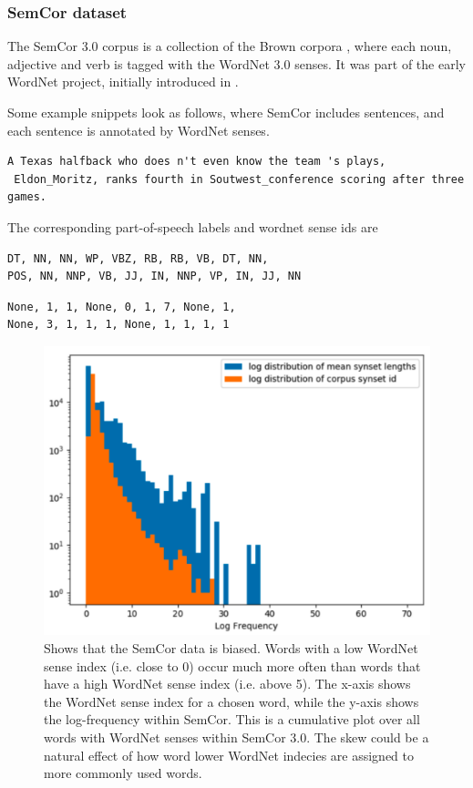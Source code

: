 \documentclass[a4paper,12pt,twoside,openright]{report}
\begin{document}
\subsubsection{SemCor dataset}

The SemCor 3.0 corpus is a collection of the Brown corpora \cite{francis64}, where each noun, adjective and verb is tagged with the WordNet 3.0 senses.
It was part of the early WordNet project, initially introduced in \cite{miller94}.

Some example snippets look as follows, where SemCor includes sentences, and each sentence is annotated by WordNet senses.

\begin{verbatim}
A Texas halfback who does n't even know the team 's plays,
 Eldon_Moritz, ranks fourth in Soutwest_conference scoring after three games.
\end{verbatim}

The corresponding part-of-speech labels and wordnet sense ids 
are
\begin{verbatim}
DT, NN, NN, WP, VBZ, RB, RB, VB, DT, NN, 
POS, NN, NNP, VB, JJ, IN, NNP, VP, IN, JJ, NN
\end{verbatim}

\begin{verbatim}
None, 1, 1, None, 0, 1, 7, None, 1, 
None, 3, 1, 1, 1, None, 1, 1, 1, 1
\end{verbatim}


\begin{figure}[h]
	\center
  \includegraphics[width=0.6\linewidth]{./assets/background/semcor_skew.png}
  \caption{Shows that the SemCor data is biased. Words with a low WordNet sense index (i.e. close to 0) occur much more often than words that have a high WordNet sense index (i.e. above 5).
  The x-axis shows the WordNet sense index for a chosen word, while the y-axis shows the log-frequency within SemCor. 
  This is a cumulative plot over all words with WordNet senses within SemCor 3.0.
  The skew could be a natural effect of how word lower WordNet indecies are assigned to more commonly used words.
  }
  \label{fig:embeddings_by_language}
\end{figure}
\end{document}

